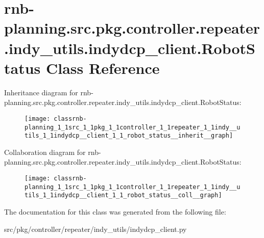 \hypertarget{classrnb-planning_1_1src_1_1pkg_1_1controller_1_1repeater_1_1indy__utils_1_1indydcp__client_1_1_robot_status}{}\section{rnb-\/planning.src.\+pkg.\+controller.\+repeater.\+indy\+\_\+utils.\+indydcp\+\_\+client.\+Robot\+Status Class Reference}
\label{classrnb-planning_1_1src_1_1pkg_1_1controller_1_1repeater_1_1indy__utils_1_1indydcp__client_1_1_robot_status}


Inheritance diagram for rnb-\/planning.src.\+pkg.\+controller.\+repeater.\+indy\+\_\+utils.\+indydcp\+\_\+client.\+Robot\+Status\+:
\nopagebreak
\begin{figure}[H]
\begin{center}
\leavevmode
\texttt{[image: classrnb-planning\_1\_1src\_1\_1pkg\_1\_1controller\_1\_1repeater\_1\_1indy\_\_utils\_1\_1indydcp\_\_client\_1\_1\_robot\_status\_\_inherit\_\_graph]}
\end{center}
\end{figure}


Collaboration diagram for rnb-\/planning.src.\+pkg.\+controller.\+repeater.\+indy\+\_\+utils.\+indydcp\+\_\+client.\+Robot\+Status\+:
\nopagebreak
\begin{figure}[H]
\begin{center}
\leavevmode
\texttt{[image: classrnb-planning\_1\_1src\_1\_1pkg\_1\_1controller\_1\_1repeater\_1\_1indy\_\_utils\_1\_1indydcp\_\_client\_1\_1\_robot\_status\_\_coll\_\_graph]}
\end{center}
\end{figure}


The documentation for this class was generated from the following file\+:\begin{DoxyCompactItemize}
\item 
src/pkg/controller/repeater/indy\+\_\+utils/indydcp\+\_\+client.\+py\end{DoxyCompactItemize}
